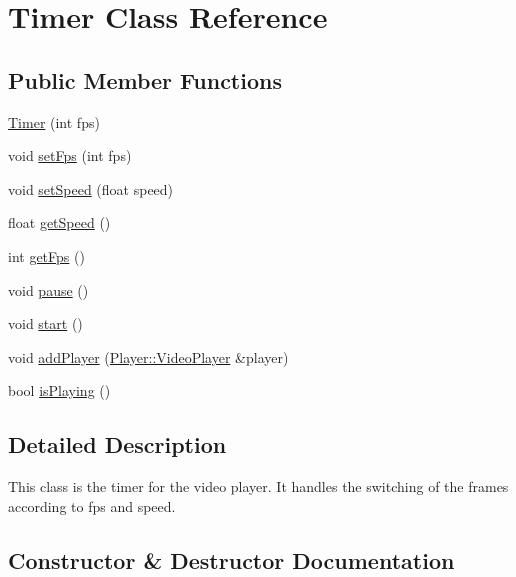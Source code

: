 \hypertarget{classPlayer_1_1Timer}{}\section{Timer Class Reference}
\label{classPlayer_1_1Timer}
\subsection*{Public Member Functions}
\begin{DoxyCompactItemize}
\item 
\hyperlink{classPlayer_1_1Timer_ab333b697b20790f9c540b1c34f1a5eab}{Timer} (int fps)
\item 
void \hyperlink{classPlayer_1_1Timer_a9913d8cd6d012c0ecfbc2de831d9d7cd}{set\+Fps} (int fps)
\item 
void \hyperlink{classPlayer_1_1Timer_a5466c67c5ec22359c0702dc4ac8ffb19}{set\+Speed} (float speed)
\item 
float \hyperlink{classPlayer_1_1Timer_a26ebefde7fe71954e6c1282255951b7d}{get\+Speed} ()
\item 
int \hyperlink{classPlayer_1_1Timer_a519ad5c0664b9de28c1a6d9dc77f959d}{get\+Fps} ()
\item 
void \hyperlink{classPlayer_1_1Timer_a7167f5c196fc5e167bfabde1a730e81d}{pause} ()
\item 
void \hyperlink{classPlayer_1_1Timer_a60de64d75454385b23995437f1d72669}{start} ()
\item 
void \hyperlink{classPlayer_1_1Timer_ad054282cb761625591b5b4168fe21a44}{add\+Player} (\hyperlink{classPlayer_1_1VideoPlayer}{Player\+::\+Video\+Player} \&player)
\item 
bool \hyperlink{classPlayer_1_1Timer_a8438e3403946accc1986a05b89ee7b03}{is\+Playing} ()
\end{DoxyCompactItemize}


\subsection{Detailed Description}
This class is the timer for the video player. It handles the switching of the frames according to fps and speed. 

\subsection{Constructor \& Destructor Documentation}
\hypertarget{classPlayer_1_1Timer_ab333b697b20790f9c540b1c34f1a5eab}{}
